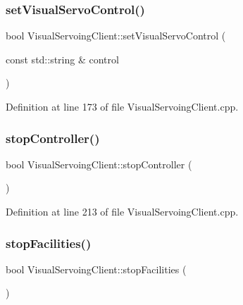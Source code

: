 \subsubsection{\texorpdfstring{set\+Visual\+Servo\+Control()}{setVisualServoControl()}}
{\footnotesize\ttfamily bool Visual\+Servoing\+Client\+::set\+Visual\+Servo\+Control (\begin{DoxyParamCaption}\item[{const std\+::string \&}]{control }\end{DoxyParamCaption})\hspace{0.3cm}{\ttfamily [override]}}



Definition at line 173 of file Visual\+Servoing\+Client.\+cpp.

\mbox{\label{classVisualServoingClient_aad4f96122bd48b7e8aa08673bde3031b}} 
\subsubsection{\texorpdfstring{stop\+Controller()}{stopController()}}
{\footnotesize\ttfamily bool Visual\+Servoing\+Client\+::stop\+Controller (\begin{DoxyParamCaption}{ }\end{DoxyParamCaption})\hspace{0.3cm}{\ttfamily [override]}}



Definition at line 213 of file Visual\+Servoing\+Client.\+cpp.

\mbox{\label{classVisualServoingClient_a6086c261684ff994d4daf31a1a7ffd0f}} 
\subsubsection{\texorpdfstring{stop\+Facilities()}{stopFacilities()}}
{\footnotesize\ttfamily bool Visual\+Servoing\+Client\+::stop\+Facilities (\begin{DoxyParamCaption}{ }\end{DoxyParamCaption})\hspace{0.3cm}{\ttfamily [override]}}



